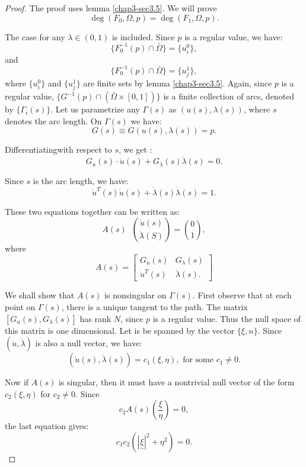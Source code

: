 \begin{proof}
The proof uses lemma \ref{chap3-sec3.5}. We will prove 
$$
\deg (F_0,
\Omega , p) = \deg (F_1, \Omega , p).
$$

The case for any $\lambda \in
(0,1)$ is included. Since $p$ is a regular value, we have:  
$$
\{ F^{-1}_0 (p) \cap \bar{\Omega} \} = \{u^0_i \},
$$
and 
$$
\{ F^{-1}_0 (p) \cap \bar{\Omega} \} = \{ u^1_j \}, 
$$
where $\{ u^0_i \}$ and $\{ u^1_j \}$ are finite sets by lemma
\ref{chap3-sec3.5}. Again, since $p$ is a regular value, $\{ G^{-1}(p)
\cap (\bar{\Omega} \times [0,1]) \}$ is a finite collection of arcs,
denoted by $\{ \Gamma_i (s)\}$. Let us parametrize any $\Gamma(s)$ as
$(u(s), \lambda(s))$, where $s$ denotes the arc length. On $\Gamma(s)$
we have: 
$$ 
G(s) \equiv G(u(s), \lambda(s)) = p. 
$$

Differentiating\pageoriginale with respect to $s$, we get :
$$
G_u(s) \cdot \dot{u}(s) +  G_\lambda (s) \dot{\lambda} (s) = 0. 
$$

Since $s$ is the arc length, we have:
$$
\dot{u}^T (s) \dot{u}(s) + \dot{\lambda} (s) \dot{\lambda} (s) = 1.
$$

These two equations together can be written as:
\begin{equation*}
A(s) \;\; \binom{\dot{u}(s)}{\dot{\lambda} (S)} = \binom{0}{1} ,
\tag{3.12a}\label{chap3-sec3.11-eq3.12a} 
\end{equation*}
where
\begin{equation*}
A(s) =
\begin{bmatrix}
G_u(s) & G_\lambda (s) \\
\dot{u}^T(s) & \dot{\lambda} (s) .
\end{bmatrix}
\end{equation*}

We shall show that $A(s)$ is nonsingular on $\Gamma(s)$. First observe
that at each point on $\Gamma(s)$, there is a unique tangent to the
path. The matrix $[G_u(s), G_\lambda(s)]$ has rank $N$, since $p$ is a
regular value. Thus the null space of this matrix is one
dimensional. Let is be spanned by the vector $\{ \xi, n \}$. Since
$(\dot{u},  \dot{\lambda})$ is also a null vector, we have: 
$$
(\dot{u}(s), \dot{\lambda}(s)) = c_1 (\xi, \eta), \text{ \ for some\ }
c_1 \neq 0. 
$$

Now if $A(s)$ is singular, then it must have a nontrivial null vector
of the form $c_2(\xi, \eta)$ for $c_2 \neq 0$. Since 
$$
c_2 A(s) (\frac{\xi}{\eta}) = 0,
$$
the last equation gives: 
$$
c_1c_2 (| \underset{\sim}{\xi} |^2 + \eta^2) = 0.
$$


\end{proof}
